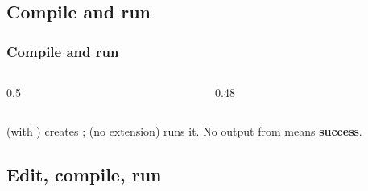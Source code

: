 \documentclass[aspectratio=169,10pt,compress]{beamer}
\begin{document}

\subsection[Compile]{Compile and run}




\begin{frame}[t,fragile] \frametitle{Compile and run}
  \begin{columns}[T]
    \begin{column}{0.5\textwidth}
    \end{column}
    \begin{column}{0.48\textwidth}
    \end{column}
  \end{columns}

  \vspace{0.1em}
  \small 
   (with ) creates ; 
   (no extension) runs it.
  No output from  means \textbf{success}.
\end{frame}

\subsection[Cycle]{Edit, compile, run}
\end{document}
